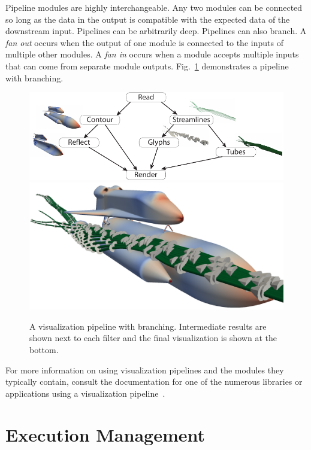 \documentclass[journal,onecolumn,12pt,letterpaper,twoside]{IEEEtran}
\newcommand*{\lcite}[1]{~\cite{#1}}
\newcommand*{\figref}[1]{Fig.~\ref{#1}}
\newcommand*{\keyterm}[1]{\emph{#1}}
\begin{document}
Pipeline modules are highly interchangeable.  Any two modules can be
connected so long as the data in the output is compatible with the expected
data of the downstream input.  Pipelines can be arbitrarily deep.
Pipelines can also branch.  A \keyterm{fan out} occurs when the output of
one module is connected to the inputs of multiple other modules.  A
\keyterm{fan in} occurs when a module accepts multiple inputs that can
come from separate module outputs.  \figref{fig:BranchingPipeline}
demonstrates a pipeline with branching.

\begin{figure}[htbp]
  \centering
  \includegraphics[width=5.5in]{images/BranchingPipeline2} \\
  \includegraphics[width=5.5in]{images/BranchingPipeline2Result}
  \caption{A visualization pipeline with branching.  Intermediate results
    are shown next to each filter and the final visualization is shown at
    the bottom.}
  \label{fig:BranchingPipeline}
\end{figure}

For more information on using visualization pipelines and the modules
they typically contain, consult the documentation for one of the numerous
libraries or applications using a visualization
pipeline\lcite{VTK,ParaView,ParaViewTutorial,SCIRunUserGuide,IRISExplorerUsersGuide,VisTrailsDocumentation,OpenDXGuide}.


\section{Execution Management}
\label{sec:ExecutionManagement}
\end{document}
